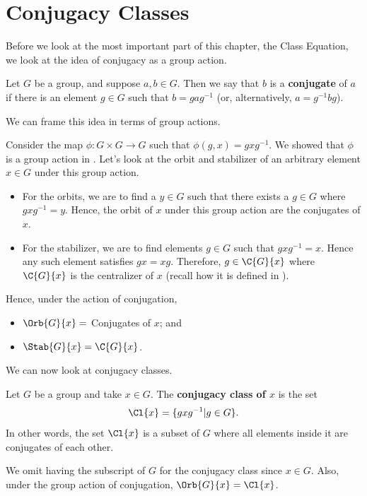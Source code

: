 \newpage

\section{Conjugacy Classes}
Before we look at the most important part of this chapter, the Class Equation, we look at the idea of conjugacy as a group action.
\begin{definition}
    Let $G$ be a group, and suppose $a, b \in G$. Then we say that $b$ is a \textbf{conjugate} of $a$ if there is an element $g \in G$ such that $b = gag^{-1}$ (or, alternatively, $a=g^{-1}bg$).
\end{definition}
We can frame this idea in terms of group actions.

Consider the map $\phi: G\times G\to G$ such that $\phi(g, x) = gxg^{-1}$. We showed that $\phi$ is a group action in . Let's look at the orbit and stabilizer of an arbitrary element $x \in G$ under this group action.
\begin{itemize}
    \item For the orbits, we are to find a $y \in G$ such that there exists a $g \in G$ where $gxg^{-1} = y$. Hence, the orbit of $x$ under this group action are the conjugates of $x$.
    \item For the stabilizer, we are to find elements $g \in G$ such that $gxg^{-1} = x$. Hence any such element satisfies $gx = xg$. Therefore, $g \in \C{G}{x}$ where $\C{G}{x}$ is the centralizer of $x$ (recall how it is defined in ).
\end{itemize}

Hence, under the action of conjugation,
\begin{itemize}
    \item $\Orb{G}{x} = $ Conjugates of $x$; and
    \item $\Stab{G}{x} = \C{G}{x}$.
\end{itemize}

\newpage

We can now look at conjugacy classes.
\begin{definition}
    Let $G$ be a group and take $x \in G$. The \textbf{conjugacy class of $x$} is the set
    \[
        \Cl{x} = \{gxg^{-1} \vert g \in G\}.
    \]
    In other words, the set $\Cl{x}$ is a subset of $G$ where all elements inside it are conjugates of each other.
\end{definition}
\begin{remark}
    We omit having the subscript of $G$ for the conjugacy class since $x \in G$. Also, under the group action of conjugation, $\Orb{G}{x} = \Cl{x}$.
\end{remark}

